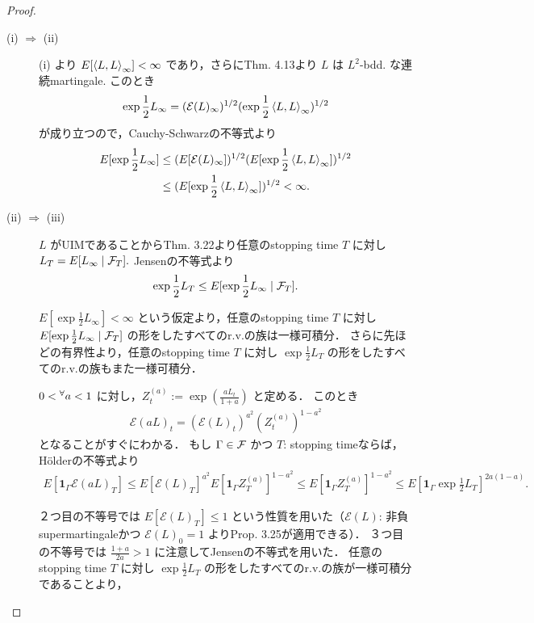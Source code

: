 \documentclass{jsarticle}
\begin{document}
\begin{proof}
    \begin{description}
        \item[(i) $\Rightarrow$ (ii)]
        (i) より $E[\left\langle L,L\right\rangle_{\infty}]<\infty$ であり，さらにThm. 4.13より $L$ は $L^2$-bdd. な連続martingale.
        このとき
        \begin{align}
            \exp\frac{1}{2}L_{\infty}
            = (\mathcal{E}(L)_{\infty})^{1/2}(\exp\frac{1}{2}\left\langle L,L\right\rangle_{\infty})^{1/2}
        \end{align}
        が成り立つので，Cauchy-Schwarzの不等式より
        \begin{align}
            E[\exp\frac{1}{2}L_{\infty}]
            &\le (E[\mathcal{E}(L)_{\infty}])^{1/2}
            (E[\exp\frac{1}{2}\left\langle L,L\right\rangle_{\infty}])^{1/2} \\
            &\le (E[\exp\frac{1}{2}\left\langle L,L\right\rangle_{\infty}])^{1/2}
            < \infty.
        \end{align}
        
        \item[(ii) $\Rightarrow$ (iii)]
        $L$ がUIMであることからThm. 3.22より任意のstopping time $T$ に対し $L_T=E[L_{\infty}\mid\mathcal{F}_T].$
        Jensenの不等式より
        \begin{align}
            \exp\frac{1}{2}L_T
            \le E[\exp\frac{1}{2}L_{\infty}\mid\mathcal{F}_T].
        \end{align}

        $E[\exp\frac{1}{2}L_{\infty}]<\infty$ という仮定より，任意のstopping time $T$ に対し $E[\exp\frac{1}{2}L_{\infty}\mid\mathcal{F}_T]$ の形をしたすべてのr.v.の族は一様可積分．
        さらに先ほどの有界性より，任意のstopping time $T$ に対し $\exp\frac{1}{2}L_T$ の形をしたすべてのr.v.の族もまた一様可積分．

        $0<{}^{\forall} a<1$ に対し，$Z_t^{(a)}:=\exp(\frac{aL_t}{1+a})$ と定める．
        このとき
        \begin{align}
            \mathcal{E}(aL)_t
            = (\mathcal{E}(L)_t)^{a^2}(Z_t^{(a)})^{1-a^2}
        \end{align}
        となることがすぐにわかる．
        もし $\Gamma\in\mathcal{F}$ かつ $T$: stopping timeならば，H\"{o}lderの不等式より
        \begin{align}
            E[\bm{1}_\Gamma\mathcal{E}(aL)_T]
            \le E[\mathcal{E}(L)_T]^{a^2}
            E[\bm{1}_\Gamma Z_T^{(a)}]^{1-a^2}
            \le E[\bm{1}_\Gamma Z_T^{(a)}]^{1-a^2}
            \le E[\bm{1}_\Gamma\exp\frac{1}{2}L_T]^{2a(1-a)}.
        \end{align}

        ２つ目の不等号では $E[\mathcal{E}(L)_T]\le1$ という性質を用いた（$\mathcal{E}(L)$: 非負supermartingaleかつ $\mathcal{E}(L)_0=1$ よりProp. 3.25が適用できる）．
        ３つ目の不等号では $\frac{1+a}{2a}>1$ に注意してJensenの不等式を用いた．
        任意のstopping time $T$ に対し $\exp\frac{1}{2}L_T$ の形をしたすべてのr.v.の族が一様可積分であることより，
    \end{description}
\end{proof}
\end{document}
